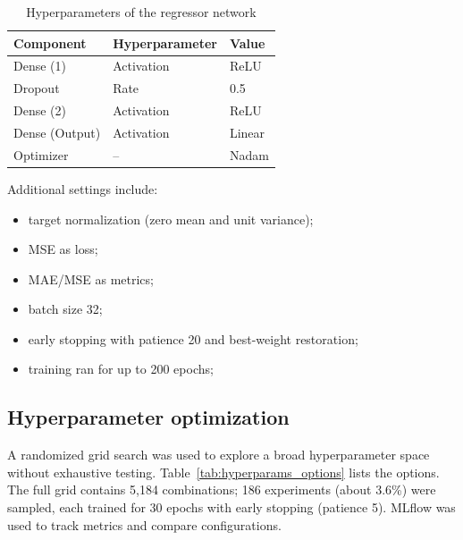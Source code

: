 \begin{table}[htb] \small \centering
  \caption{Hyperparameters of the regressor network}
  \label{tab:hyperparams_regressor}
  \begin{tabular}{l|l|l}
    \hline
    Component      & Hyperparameter & Value  \\
    \hline
    Dense (1)      & Activation     & ReLU   \\
    Dropout        & Rate           & 0.5    \\
    Dense (2)      & Activation     & ReLU   \\
    Dense (Output) & Activation     & Linear \\
    Optimizer      & --             & Nadam  \\
    \hline
  \end{tabular}
\end{table}

Additional settings include:

\begin{itemize}
  \item target normalization (zero mean and unit variance);
  \item MSE as loss;
  \item MAE/MSE as metrics;
  \item batch size 32;
  \item early stopping with patience 20 and best-weight restoration;
  \item training ran for up to 200 epochs;
\end{itemize}

\subsection{Hyperparameter optimization}

A randomized grid search was used to explore a broad hyperparameter space without exhaustive testing. Table~\ref{tab:hyperparams_options} lists the options. The full grid contains 5,184 combinations; 186 experiments (about 3.6\%) were sampled, each trained for 30 epochs with early stopping (patience 5). MLflow was used to track metrics and compare configurations.

